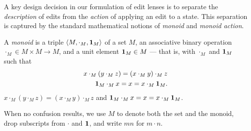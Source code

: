 
\label{sec:semantics}

A key design decision in our formulation of edit lenses is to separate the
{\em description} of edits from the {\em action} of applying an edit to a
state.  This separation is captured by the standard mathematical notions of
{\em monoid} and {\em monoid action}.

\begin{defn}
A \emph{monoid} is a triple $\left<M,\cdot_M,\mbox{\bf{1}}_M\right>$ of a set
$M$, an associative binary operation $\cdot_M \in M \times M
\to M$, and a unit element $\mbox{\bf{1}}_M \in M$ --- that is, with $\cdot_M$ and $\mbox{\bf{1}}_M$ such that
\iffull
\begin{eqnarray*}
x\cdot_M(y\cdot_M z) = (x\cdot_M y) \cdot_M z\\
\mbox{\bf{1}}_M\cdot_M x = x = x \cdot_M \mbox{\bf{1}}_M .
\end{eqnarray*}
\else
$x\cdot_M(y\cdot_M z) = (x\cdot_M y) \cdot_M z $ and
$\mbox{\bf{1}}_M\cdot_M x = x = x \cdot_M \mbox{\bf{1}}_M$.
\fi
\end{defn}
When no confusion results, we use $M$ to denote both the set and the
monoid, drop subscripts from $\cdot$ and $\mbox{\bf{1}}$, and write $mn$ for
$m \cdot n$.  

